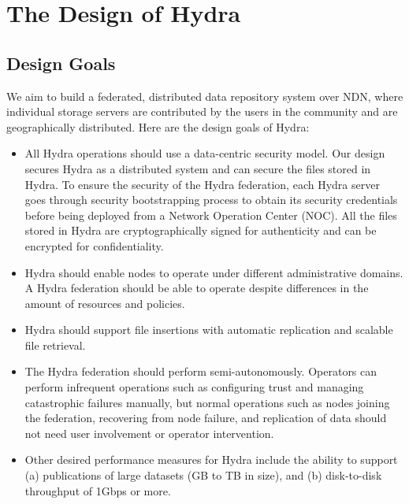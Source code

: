 \section{The Design of Hydra} \label{sec:design}



\subsection{Design Goals} 
\label{subsec:design-goals}
We aim to build a federated, distributed data repository system over NDN, where individual storage servers are contributed by the users in the community and are geographically distributed. Here are the design goals of Hydra:

\begin{itemize}

\item All Hydra operations should use a data-centric security model. Our design secures Hydra as a distributed system and can secure the files stored in Hydra. To ensure the security of the Hydra federation, each Hydra server goes through security bootstrapping process to obtain its security credentials before being deployed from a Network Operation Center (NOC). All the files stored in Hydra are cryptographically signed for authenticity and can be encrypted for confidentiality. 


\item Hydra should enable nodes to operate under different administrative domains. A Hydra federation should be able to operate despite differences in the amount of resources and policies.


\item Hydra should support file insertions with automatic replication and scalable file retrieval. 

\item The Hydra federation should perform semi-autonomously. Operators can perform infrequent operations such as configuring trust and managing catastrophic failures manually, but normal operations such as nodes joining the federation, recovering from node failure, and replication of data should not need user involvement or operator intervention.


\item Other desired performance measures for Hydra include the ability to support (a) publications of large datasets (GB to TB in size),  and (b) disk-to-disk throughput of 1Gbps or more.

\end{itemize}

